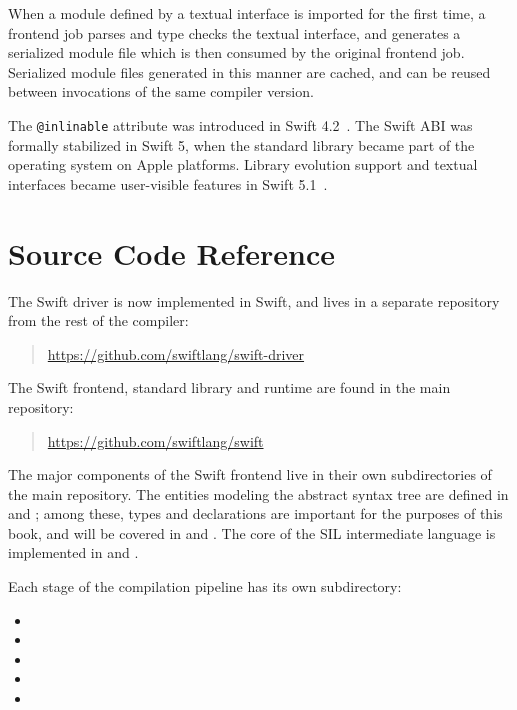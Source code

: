 \documentclass[../generics]{subfiles}
\begin{document}
When a module defined by a textual interface is imported for the first time, a frontend job parses and type checks the textual interface, and generates a serialized module file which is then consumed by the original frontend job. Serialized module files generated in this manner are cached, and can be reused between invocations of the same compiler version.

The \texttt{@inlinable} attribute was introduced in Swift 4.2~\cite{se0193}. The Swift ABI was formally stabilized in Swift 5, when the standard library became part of the operating system on Apple platforms. Library evolution support and textual interfaces became user-visible features in Swift 5.1~\cite{se0260}.

\section{Source Code Reference}\label{compilation model source reference}

The Swift driver is now implemented in Swift, and lives in a separate repository from the rest of the compiler:
\begin{quote}
\url{https://github.com/swiftlang/swift-driver}
\end{quote}
The Swift frontend, standard library and runtime are found in the main repository:
\begin{quote}
\url{https://github.com/swiftlang/swift}
\end{quote}
The major components of the Swift frontend live in their own subdirectories of the main repository. The entities modeling the abstract syntax tree are defined in  and ; among these, types and declarations are important for the purposes of this book, and will be covered in  and . The core of the SIL intermediate language is implemented in  and .

Each stage of the compilation pipeline has its own subdirectory:
\begin{itemize}
\item {}
\item {}
\item {}
\item {}
\item {}
\end{itemize}
\end{document}
